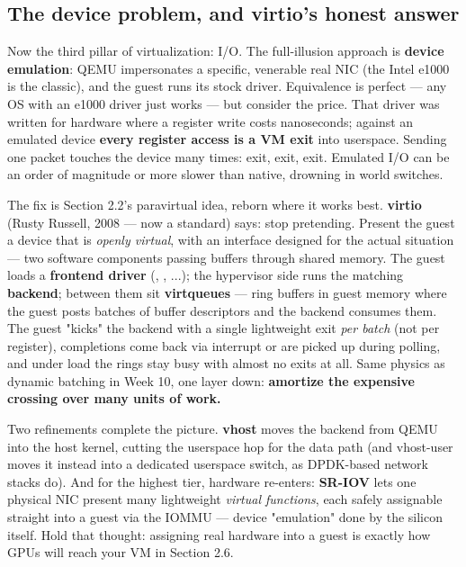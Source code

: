 \subsection*{The device problem, and virtio's honest answer}

Now the third pillar of virtualization: I/O. The full-illusion approach is \textbf{device emulation}: QEMU impersonates a specific, venerable real NIC (the Intel e1000 is the classic), and the guest runs its stock driver. Equivalence is perfect — any OS with an e1000 driver just works — but consider the price. That driver was written for hardware where a register write costs nanoseconds; against an emulated device \textbf{every register access is a VM exit} into userspace. Sending one packet touches the device many times: exit, exit, exit. Emulated I/O can be an order of magnitude or more slower than native, drowning in world switches.

The fix is Section 2.2's paravirtual idea, reborn where it works best. \textbf{virtio} (Rusty Russell, 2008 — now a standard) says: stop pretending. Present the guest a device that is \textit{openly virtual}, with an interface designed for the actual situation — two software components passing buffers through shared memory. The guest loads a \textbf{frontend driver} (, , ...); the hypervisor side runs the matching \textbf{backend}; between them sit \textbf{virtqueues} — ring buffers in guest memory where the guest posts batches of buffer descriptors and the backend consumes them. The guest "kicks" the backend with a single lightweight exit \textit{per batch} (not per register), completions come back via interrupt or are picked up during polling, and under load the rings stay busy with almost no exits at all. Same physics as dynamic batching in Week 10, one layer down: \textbf{amortize the expensive crossing over many units of work.}

Two refinements complete the picture. \textbf{vhost} moves the backend from QEMU into the host kernel, cutting the userspace hop for the data path (and vhost-user moves it instead into a dedicated userspace switch, as DPDK-based network stacks do). And for the highest tier, hardware re-enters: \textbf{SR-IOV} lets one physical NIC present many lightweight \textit{virtual functions}, each safely assignable straight into a guest via the IOMMU — device "emulation" done by the silicon itself. Hold that thought: assigning real hardware into a guest is exactly how GPUs will reach your VM in Section 2.6.

